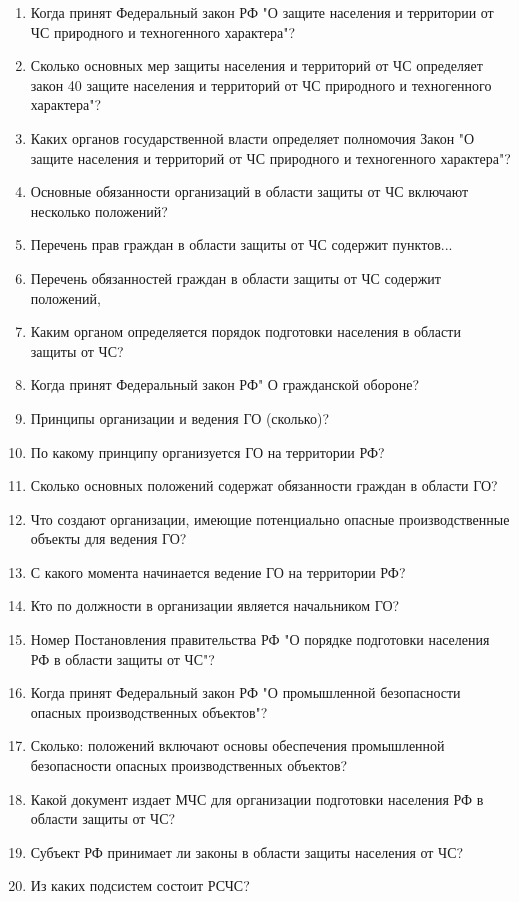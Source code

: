 \documentclass[oneside,final,14pt]{extreport}
\begin{document}
\begin{enumerate}
	\item  Когда принят Федеральный закон РФ "О защите населения и территории от ЧС природного и техногенного характера"?
	\item  Сколько основных мер защиты населения и территорий от ЧС определяет закон 40 защите населения и территорий от ЧС природного и техногенного характера"?
	\item  Каких органов государственной власти определяет полномочия Закон "О
	защите населения и территорий от ЧС природного и техногенного характера"?
	\item  Основные обязанности организаций в области защиты от ЧС включают несколько положений?
	\item  Перечень прав граждан в области защиты от ЧС содержит пунктов...
	\item  Перечень обязанностей граждан в области защиты от ЧС содержит положений,
	\item  Каким органом определяется порядок подготовки населения в области защиты от ЧС?
	\item  Когда принят Федеральный закон РФ" О гражданской обороне?
	\item Принципы организации и ведения ГО (сколько)?
	\item  По какому принципу организуется ГО на территории РФ?
	\item  Сколько основных положений содержат обязанности граждан в области ГО?
	\item  Что создают организации, имеющие потенциально опасные производственные объекты для ведения ГО?
	\item  С какого момента начинается ведение ГО на территории РФ?
	\item  Кто по должности в организации является начальником ГО?
	\item  Номер Постановления правительства РФ "О порядке подготовки населения РФ в области защиты от ЧС"?
	\item  Когда принят Федеральный закон РФ "О промышленной безопасности опасных производственных объектов"?
	\item  Сколько: положений включают основы обеспечения промышленной безопасности опасных производственных объектов?
	\item  Какой документ издает МЧС для организации подготовки населения РФ в области защиты от ЧС?
	\item Субъект РФ принимает ли законы в области защиты населения от ЧС?
	\item  Из каких подсистем состоит РСЧС?
	

\end{enumerate}
\end{document}
